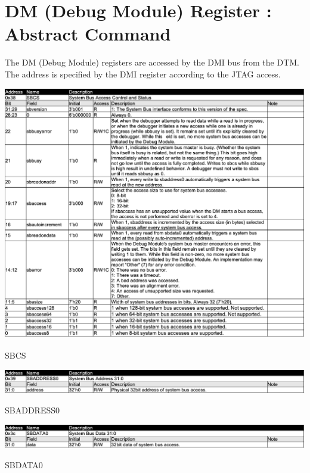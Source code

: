 \section{DM (Debug Module) Register : Abstract Command}

The DM (Debug Module) registers are accessed by the DMI bus from the DTM. The address is specified by the DMI register according to the JTAG access.

\begin{table}[H]
    \includegraphics[width=1.00\columnwidth]{./Table/SBCS.png}
    \caption{SBCS}
    \label{tb:SBCS}
\end{table}

\begin{table}[H]
    \includegraphics[width=1.00\columnwidth]{./Table/SBADDRESS0.png}
    \caption{SBADDRESS0}
    \label{tb:SBADDRESS0}
\end{table}

\begin{table}[H]
    \includegraphics[width=1.00\columnwidth]{./Table/SBDATA0.png}
    \caption{SBDATA0}
    \label{tb:SBDATA0}
\end{table}

